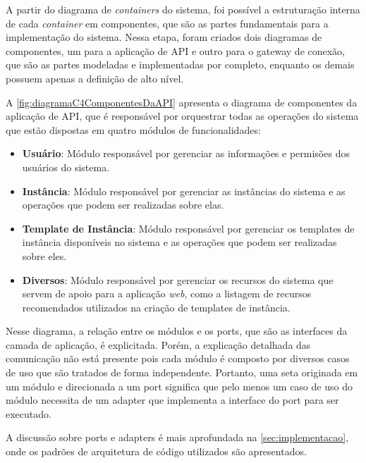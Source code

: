 A partir do diagrama de \textit{containers} do sistema, foi possível a estruturação interna de cada \textit{container} em componentes, que são as partes fundamentais para a implementação do sistema.
Nessa etapa, foram criados dois diagramas de componentes, um para a aplicação de API e outro para o gateway de conexão, que são as partes modeladas e implementadas por completo, enquanto os demais possuem apenas a definição de alto nível.

A \autoref{fig:diagramaC4ComponentesDaAPI} apresenta o diagrama de componentes da aplicação de API, que é responsável por orquestrar todas as operações do sistema que estão dispostas em quatro módulos de funcionalidades:

\begin{itemize}
    \item \textbf{Usuário}: Módulo responsável por gerenciar as informações e permisões dos usuários do sistema.

    \item \textbf{Instância}: Módulo responsável por gerenciar as instâncias do sistema e as operações que podem ser realizadas sobre elas.

    \item \textbf{Template de Instância}: Módulo responsável por gerenciar os templates de instância disponíveis no sistema e as operações que podem ser realizadas sobre eles.

    \item \textbf{Diversos}: Módulo responsável por gerenciar os recursos do sistema que servem de apoio para a aplicação \textit{web}, como a listagem de recursos recomendados utilizados na criação de templates de instância.

\end{itemize}

Nesse diagrama, a relação entre os módulos e os \glspl{port}, que são as interfaces da camada de aplicação, é explicitada. Porém, a explicação detalhada das comunicação não está presente pois cada módulo é composto por diversos casos de uso que são tratados de forma independente. Portanto, uma seta originada em um módulo e direcionada a um \gls{port} significa que pelo menos um caso de uso do módulo necessita de um \gls{adapter} que implementa a interface do \gls{port} para ser executado. 

A discussão sobre \glspl{port} e \glspl{adapter} é mais aprofundada na \autoref{sec:implementacao},
onde os padrões de arquitetura de código utilizados são apresentados.


